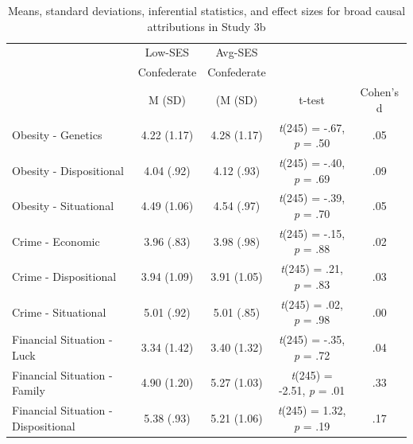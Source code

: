 \documentclass{sfuthesis}
\begin{document}
\begin{table}[h]
  \begin{center}
    \caption{Means, standard deviations, inferential statistics, and effect sizes for broad causal attributions in Study 3b}
    \label{tab:ninthtable}
    \begin{tabular}{l c c c c}
    \hline
      & \multicolumn{1}{c}{Low-SES} & \multicolumn{1}{c}{Avg-SES} & & \\
      & \multicolumn{1}{c}{Confederate} & \multicolumn{1}{c}{Confederate} & & \\\cmidrule{2-3}
      & \multicolumn{1}{c}{M (SD)} & \multicolumn{1}{c}{(M (SD)} & t-test & Cohen's d\\
      \hline
      Obesity - Genetics & \multicolumn{1}{c}{4.22 (1.17)} & \multicolumn{1}{c}{4.28 (1.17)} & \multicolumn{1}{c}{\textit{t}(245) = -.67, \textit{p} = .50} & .05\\
      Obesity - Dispositional & \multicolumn{1}{c}{4.04 (.92)} & \multicolumn{1}{c}{4.12 (.93)} & \multicolumn{1}{c}{\textit{t}(245) = -.40, \textit{p} = .69} & .09\\
      Obesity - Situational & \multicolumn{1}{c}{4.49 (1.06)} & \multicolumn{1}{c}{4.54 (.97)} & \multicolumn{1}{c}{\textit{t}(245) = -.39, \textit{p} = .70} & .05\\
      Crime - Economic & \multicolumn{1}{c}{3.96 (.83)} & \multicolumn{1}{c}{3.98 (.98)} & \multicolumn{1}{c}{\textit{t}(245) = -.15, \textit{p} = .88} & .02\\
      Crime - Dispositional & \multicolumn{1}{c}{3.94 (1.09)} & \multicolumn{1}{c}{3.91 (1.05)} & \multicolumn{1}{c}{\textit{t}(245) = .21, \textit{p} = .83} & .03\\
      Crime - Situational & \multicolumn{1}{c}{5.01 (.92)} & \multicolumn{1}{c}{5.01 (.85)} & \multicolumn{1}{c}{\textit{t}(245) = .02, \textit{p} = .98} & .00\\
      Financial Situation - Luck & \multicolumn{1}{c}{3.34 (1.42)} & \multicolumn{1}{c}{3.40 (1.32)} & \multicolumn{1}{c}{\textit{t}(245) = -.35, \textit{p} = .72} & .04\\
      Financial Situation - Family & \multicolumn{1}{c}{4.90 (1.20)} & \multicolumn{1}{c}{5.27 (1.03)} & \multicolumn{1}{c}{\textit{t}(245) = -2.51, \textit{p} = .01} & .33\\
      Financial Situation - Dispositional & \multicolumn{1}{c}{5.38 (.93)} & \multicolumn{1}{c}{5.21 (1.06)} & \multicolumn{1}{c}{\textit{t}(245) = 1.32, \textit{p} = .19} & .17\\

\end{tabular}
\end{center}
\end{table}
\end{document}
